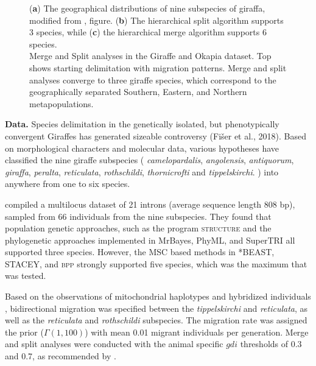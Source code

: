 \documentclass[A4]{article1}
\newcommand{\red}[1]{{\color{red}{#1}}}
\begin{document}
\begin{figure}[t]
    \caption{\red{[For each of the empirical examples, perhaps include a picture of the
      animal, a map showing geographical distribution, the guide tree, and the merge and
      split results.]} (\textbf{a}) The geographical distributions of nine subspecies of
   giraffa, modified from \citet{Petzold2020}, figure.  (\textbf{b}) The hierarchical
   split algorithm supports 3 species, while (\textbf{c}) the hierarchical merge
   algorithm supports 6 species.  \red{[colours on the map and on the tree do not seem
      to match.]}  \\ %
   Merge and Split analyses in the Giraffe and Okapia dataset. Top shows starting
   delimitation with migration patterns. Merge and split analyses converge to three
   giraffe species, which correspond to the geographically separated Southern,
   Eastern, and Northern metapopulations. %
} \label{fig:giraffe}
\end{figure}

\textbf{Data.}  Species delimitation in the genetically isolated, but
phenotypically convergent Giraffes has generated
sizeable controversy (Fišer et al., 2018). Based
on morphological characters and molecular data,
various hypotheses have classified the nine giraffe
subspecies ( \textit{camelopardalis},
\textit{angolensis}, \textit{antiquorum}, \textit{giraffa}, \textit{peralta},
\textit{reticulata}, \textit{rothschildi}, \textit{thornicrofti} and
\textit{tippelskirchi}. ) into anywhere from one to six species.

\citet{Petzold2020} compiled a multilocus dataset of 21 introns (average sequence length
808 bp), sampled from 66 individuals from the nine subspecies.  They found that
population genetic approaches, such as the program \textsc{structure} and the
phylogenetic approaches implemented in MrBayes, PhyML, and SuperTRI all supported three
species. However, the MSC based methods in *BEAST, STACEY, and \textsc{bpp} strongly
supported five species, which was the maximum that was tested. 


Based on the observations of mitochondrial haplotypes and
hybridized individuals \citep{Fennessy2016, Petzold2020}, bidirectional migration was
specified between the \textit{tippelskirchi} and \textit{reticulata}, as well as the
\textit{reticulata} and \textit{rothschildi} subspecies.  The migration rate was assigned
the prior ($\Gamma (1,100)$) with mean 0.01 migrant individuals per generation.  Merge and
split analyses were conducted with the animal specific $gdi$ thresholds of 0.3 and 0.7, as
recommended by \citet{Jackson2017}.
\end{document}
